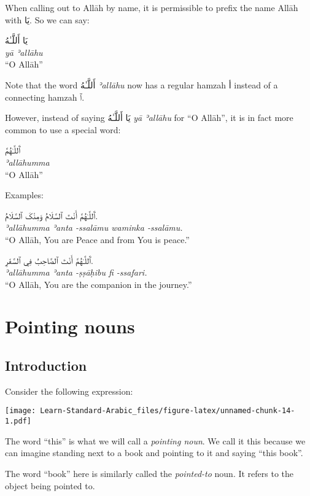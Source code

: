 \documentclass[
  10pt,
]{book}
\begin{document}
When calling out to Allāh by name, it is permissible to prefix the name Allāh with \foreignlanguage{arabic}{يَا}. So we can say:

\foreignlanguage{arabic}{يَا أَللَّـٰهُ}\\
\emph{yā ʾallāhu}\\
\enquote{O Allāh}

Note that the word \foreignlanguage{arabic}{أَللَّـٰهُ} \emph{ʾallāhu} now has a regular hamzah \foreignlanguage{arabic}{أ} instead of a connecting hamzah \foreignlanguage{arabic}{ٱ}.

However, instead of saying \foreignlanguage{arabic}{يَا أَللَّـٰهُ} \emph{yā ʾallāhu} for \enquote{O Allāh}, it is in fact more common to use a special word:

\foreignlanguage{arabic}{ٱَللَّـٰهُمَّ}\\
\emph{ʾallāhumma}\\
\enquote{O Allāh}

Examples:

\foreignlanguage{arabic}{ٱَللَّـٰهُمَّ أَنْتَ ٱلسَّلَامُ وَمِنْکَ ٱلسَّلَامُ.}\\
\emph{ʾallāhumma ʾanta -ssalāmu waminka -ssalāmu.}\\
\enquote{O Allāh, You are Peace and from You is peace.}

\foreignlanguage{arabic}{ٱَللَّـٰهُمَّ أَنْتَ ٱلصَّاحِبُ فِي ٱلسَّفَرِ.}\\
\emph{ʾallāhumma ʾanta -ṣṣāḥibu fi -ssafari.}\\
\enquote{O Allāh, You are the companion in the journey.}

\chapter{Pointing nouns}\label{pointing-nouns}

\section{Introduction}\label{introduction-14}

Consider the following expression:

\texttt{[image: Learn-Standard-Arabic\_files/figure-latex/unnamed-chunk-14-1.pdf]}

The word \enquote{this} is what we will call a \emph{pointing noun}. We call it this because we can imagine standing next to a book and pointing to it and saying \enquote{this book}.

The word \enquote{book} here is similarly called the \emph{pointed-to} noun. It refers to the object being pointed to.
\end{document}
